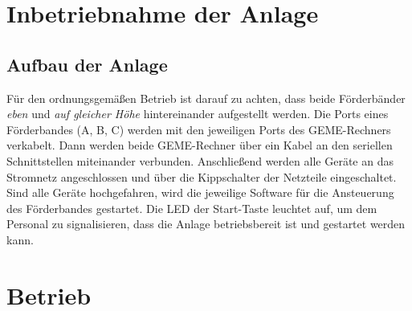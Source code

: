 \documentclass[oneside,a4paper,titlepage]{scrartcl} %
\begin{document}
\section{Inbetriebnahme der Anlage}
\subsection{Aufbau der Anlage}
Für den ordnungsgemäßen Betrieb ist darauf zu achten, dass beide Förderbänder \emph{eben} und \emph{auf gleicher Höhe} hintereinander aufgestellt werden.\newline
\newline
Die Ports eines Förderbandes (A, B, C) werden mit den jeweiligen Ports des GEME-Rechners verkabelt.\newline
\newline
Dann werden beide GEME-Rechner über ein Kabel an den seriellen Schnittstellen miteinander verbunden.\newline
\newline
Anschließend werden alle Geräte an das Stromnetz angeschlossen und über die Kippschalter der Netzteile eingeschaltet.\newline
\newline
Sind alle Geräte hochgefahren, wird die jeweilige Software für die Ansteuerung des Förderbandes gestartet.\newline
\newline
Die LED der Start-Taste leuchtet auf, um dem Personal zu signalisieren, dass die Anlage betriebsbereit ist und gestartet werden kann.

\newpage

\section{Betrieb}
\end{document}
